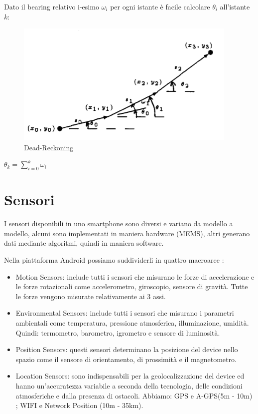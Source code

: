 \documentclass[12pt,a4paper,openright,twoside]{report}
\begin{document}
Dato il bearing relativo i-esimo $\omega_i$ per ogni istante è facile calcolare $\theta_i$ all'istante $k$:

\begin{figure}[h] 
\centering 
\includegraphics[scale=0.8]{fig1} 
\caption{Dead-Reckoning} 
\end{figure}

\begin{center}
$\theta_k = \sum_{i=0}^k \omega_i$
\end{center}

\section{Sensori}

I sensori disponibili in uno smartphone sono diversi e variano da modello a modello, alcuni sono implementati in maniera hardware (MEMS), altri generano dati mediante algoritmi, quindi in maniera software. 

Nella piattaforma Android possiamo suddividerli in quattro macroaree \cite{K9}:
\begin{itemize}
\item Motion Sensors: include tutti i sensori che misurano le forze di accelerazione e le forze rotazionali come accelerometro, giroscopio, sensore di gravità. Tutte le forze vengono misurate relativamente ai 3 assi.
\item Environmental Sensors: include tutti i sensori che misurano i parametri ambientali come temperatura, pressione atmosferica, illuminazione, umidità. Quindi: termometro, barometro, igrometro e sensore di luminosità.
\item Position Sensors: questi sensori determinano la posizione del device nello spazio come il sensore di orientamento, di prossimità e il magnetometro.
\item Location Sensors: sono indispensabili per la geolocalizzazione del device ed hanno un'accuratezza variabile a seconda della tecnologia, delle condizioni atmosferiche e dalla presenza di ostacoli. Abbiamo: GPS e A-GPS(5m - 10m) \cite{K10}; WIFI e Network Position (10m - 35km).
\end{itemize}
\end{document}

